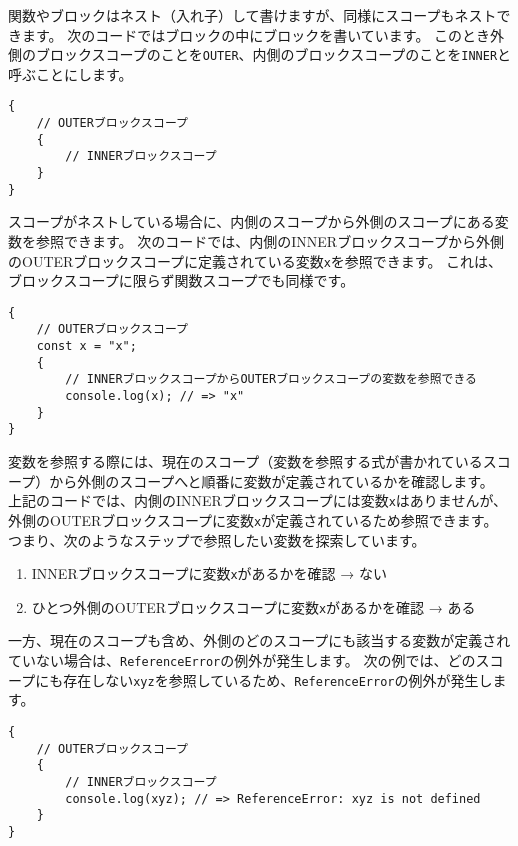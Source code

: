 関数やブロックはネスト（入れ子）して書けますが、同様にスコープもネストできます。
次のコードではブロックの中にブロックを書いています。
このとき外側のブロックスコープのことを\texttt{OUTER}、内側のブロックスコープのことを\texttt{INNER}と呼ぶことにします。

\begin{lstlisting}
{
    // OUTERブロックスコープ
    {
        // INNERブロックスコープ
    }
}
\end{lstlisting}

スコープがネストしている場合に、内側のスコープから外側のスコープにある変数を参照できます。
次のコードでは、内側のINNERブロックスコープから外側のOUTERブロックスコープに定義されている変数\texttt{x}を参照できます。
これは、ブロックスコープに限らず関数スコープでも同様です。

\begin{lstlisting}
{
    // OUTERブロックスコープ
    const x = "x";
    {
        // INNERブロックスコープからOUTERブロックスコープの変数を参照できる
        console.log(x); // => "x"
    }
}
\end{lstlisting}

変数を参照する際には、現在のスコープ（変数を参照する式が書かれているスコープ）から外側のスコープへと順番に変数が定義されているかを確認します。
上記のコードでは、内側のINNERブロックスコープには変数\texttt{x}はありませんが、外側のOUTERブロックスコープに変数\texttt{x}が定義されているため参照できます。
つまり、次のようなステップで参照したい変数を探索しています。

\begin{enumerate}
\def\labelenumi{\arabic{enumi}.}
\item
  INNERブロックスコープに変数\texttt{x}があるかを確認 → ない
\item
  ひとつ外側のOUTERブロックスコープに変数\texttt{x}があるかを確認 → ある
\end{enumerate}

一方、現在のスコープも含め、外側のどのスコープにも該当する変数が定義されていない場合は、\texttt{ReferenceError}の例外が発生します。
次の例では、どのスコープにも存在しない\texttt{xyz}を参照しているため、\texttt{ReferenceError}の例外が発生します。

\begin{lstlisting}
{
    // OUTERブロックスコープ
    {
        // INNERブロックスコープ
        console.log(xyz); // => ReferenceError: xyz is not defined
    }
}
\end{lstlisting}

